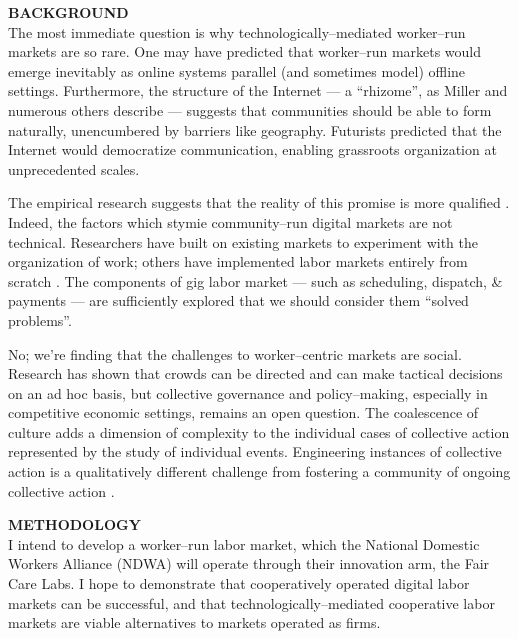 \documentclass[12pt]{article}
\newcommand{\sectitle}[1]{\textbf{\MakeUppercase{#1}}}
\begin{document}
\sectitle{background}\\
The most immediate question is why technologically--mediated
worker--run markets are so rare.
One may have predicted that worker--run markets would emerge inevitably
as online systems parallel (and sometimes model) offline settings.
Furthermore, the structure of the Internet
--- a ``rhizome'', as Miller and numerous others describe \cite{miller2011understanding} ---
suggests that communities should be able to form naturally,
unencumbered by barriers like geography.
Futurists predicted that the Internet would democratize communication,
enabling grassroots organization at unprecedented scales.

The empirical research suggests that the reality of this promise is more qualified
\cite{dynamo,toyama2015geek}.
Indeed, the factors which stymie community--run digital markets are not technical.
Researchers have built on existing markets to experiment with the organization of work;
others have implemented labor markets entirely from scratch
\cite{Alek2011,foundry}.
The components of gig labor market
--- such as scheduling, dispatch, \& payments ---
are sufficiently explored that we should consider them ``solved problems''.

No; we're finding that the challenges to worker--centric markets are social.
Research has shown that crowds can be directed
and can make tactical decisions on an ad hoc basis,
but collective governance and policy--making,
especially in competitive economic settings, remains an open question.
The coalescence of culture
adds a dimension of complexity to the individual cases of collective action represented by the study of individual events.
Engineering instances of collective action is a qualitatively different challenge from
fostering a community of ongoing collective action
\cite{russell1982collective}.

\sectitle{Methodology}\\
I intend to develop a worker--run labor market,
which the National Domestic Workers Alliance (NDWA)
will operate through their innovation arm, the Fair Care Labs.
I hope to demonstrate that cooperatively operated
digital labor markets can be successful, and that technologically--mediated
cooperative labor markets are viable alternatives to markets operated as firms.
\end{document}
